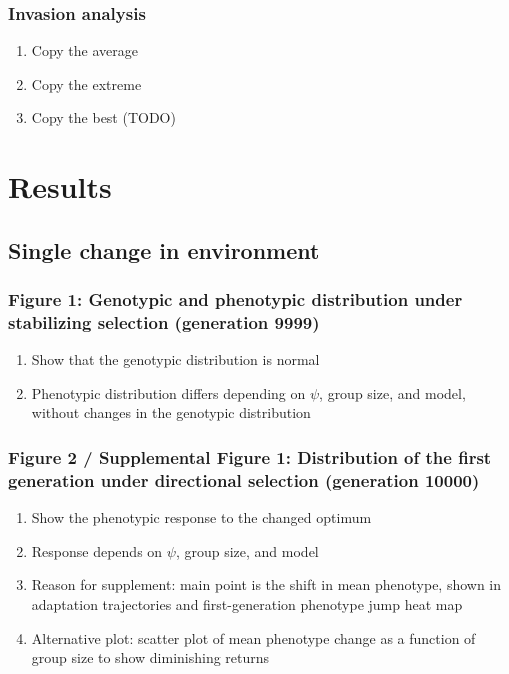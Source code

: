 \documentclass[12pt]{article}
\begin{document}
\subsubsection{Invasion analysis}
\begin{enumerate}
    \item Copy the average
    \item Copy the extreme
    \item Copy the best (TODO)
\end{enumerate}

\section{Results}

\subsection{Single change in environment}

\subsubsection{Figure 1: Genotypic and phenotypic distribution under stabilizing selection (generation 9999)}
\begin{enumerate}
    \item Show that the genotypic distribution is normal
    \item Phenotypic distribution differs depending on $\psi$, group size, and model, without changes in the genotypic distribution
\end{enumerate}

\subsubsection{Figure 2 / Supplemental Figure 1: Distribution of the first generation under directional selection (generation 10000)}
\begin{enumerate}
    \item Show the phenotypic response to the changed optimum
    \item Response depends on $\psi$, group size, and model
    \item Reason for supplement: main point is the shift in mean phenotype, shown in adaptation trajectories and first-generation phenotype jump heat map
    \item Alternative plot: scatter plot of mean phenotype change as a function of group size to show diminishing returns
\end{enumerate}
\end{document}
